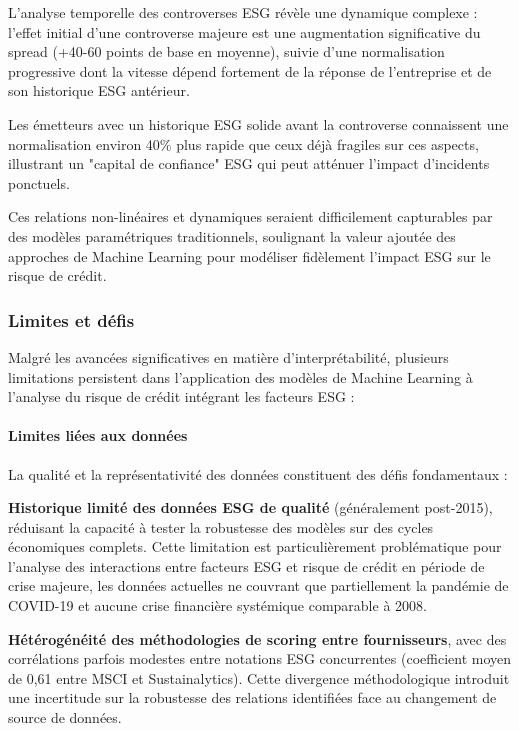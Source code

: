 L'analyse temporelle des controverses ESG révèle une dynamique complexe : l'effet initial d'une controverse majeure est une augmentation significative du spread (+40-60 points de base en moyenne), suivie d'une normalisation progressive dont la vitesse dépend fortement de la réponse de l'entreprise et de son historique ESG antérieur.

Les émetteurs avec un historique ESG solide avant la controverse connaissent une normalisation environ 40\% plus rapide que ceux déjà fragiles sur ces aspects, illustrant un "capital de confiance" ESG qui peut atténuer l'impact d'incidents ponctuels.

Ces relations non-linéaires et dynamiques seraient difficilement capturables par des modèles paramétriques traditionnels, soulignant la valeur ajoutée des approches de Machine Learning pour modéliser fidèlement l'impact ESG sur le risque de crédit.

\subsubsection{Limites et défis}

Malgré les avancées significatives en matière d'interprétabilité, plusieurs limitations persistent dans l'application des modèles de Machine Learning à l'analyse du risque de crédit intégrant les facteurs ESG :

\paragraph{Limites liées aux données}

La qualité et la représentativité des données constituent des défis fondamentaux :

\textbf{Historique limité des données ESG de qualité} (généralement post-2015), réduisant la capacité à tester la robustesse des modèles sur des cycles économiques complets. Cette limitation est particulièrement problématique pour l'analyse des interactions entre facteurs ESG et risque de crédit en période de crise majeure, les données actuelles ne couvrant que partiellement la pandémie de COVID-19 et aucune crise financière systémique comparable à 2008.

\textbf{Hétérogénéité des méthodologies de scoring entre fournisseurs}, avec des corrélations parfois modestes entre notations ESG concurrentes (coefficient moyen de 0,61 entre MSCI et Sustainalytics). Cette divergence méthodologique introduit une incertitude sur la robustesse des relations identifiées face au changement de source de données.

